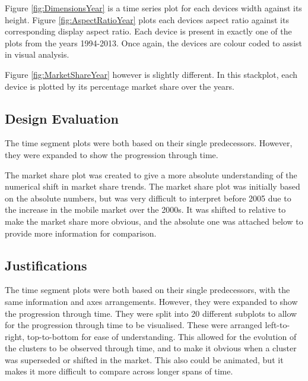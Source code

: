 \documentclass[conference]{IEEEtran}
\begin{document}
Figure \ref{fig:DimensionsYear} is a time series plot for each devices width against its height. Figure \ref{fig:AspectRatioYear} plots each devices aspect ratio against its corresponding display aspect ratio. Each device is present in exactly one of the plots from the years 1994-2013. Once again, the devices are colour coded to assist in visual analysis.

Figure \ref{fig:MarketShareYear} however is slightly different. In this stackplot, each device is plotted by its percentage market share over the years. 
\subsection{Design Evaluation}

The time segment plots were both based on their single predecessors. However, they were expanded to show the progression through time.

The market share plot was created to give a more absolute understanding of the numerical shift in market share trends.
The market share plot was initially based on the absolute numbers, but was very difficult to interpret before 2005 due to the increase in the mobile market over the 2000s. It was shifted to relative to make the market share more obvious, and the absolute one was attached below to provide more information for comparison.

\subsection{Justifications}

The time segment plots were both based on their single predecessors, with the same information and axes arrangements. However, they were expanded to show the progression through time.
They were split into 20 different subplots to allow for the progression through time to be visualised. These were arranged left-to-right, top-to-bottom for ease of understanding. 
This allowed for the evolution of the clusters to be observed through time, and to make it obvious when a cluster was superseded or shifted in the market.
This also could be animated, but it makes it more difficult to compare across longer spans of time.
\end{document}
